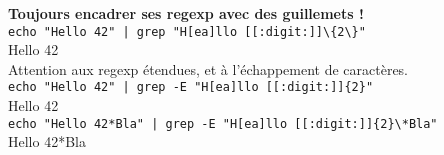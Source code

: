 \documentclass[11pt,a4paper]{article}
\begin{document}
\bigskip

\noindent \textbf{Toujours encadrer ses regexp avec des guillemets !}\\

\noindent \verb!echo "Hello 42" | grep "H[ea]llo [[:digit:]]\{2\}"!\\
\noindent \textrightarrow Hello 42\\

\noindent Attention aux regexp étendues, et à l'échappement de caractères.\\
\noindent \verb!echo "Hello 42" | grep -E "H[ea]llo [[:digit:]]{2}"!\\
\noindent \textrightarrow Hello 42\\

\noindent \verb!echo "Hello 42*Bla" | grep -E "H[ea]llo [[:digit:]]{2}\*Bla"!\\
\noindent \textrightarrow Hello 42*Bla\\

\end{document}
